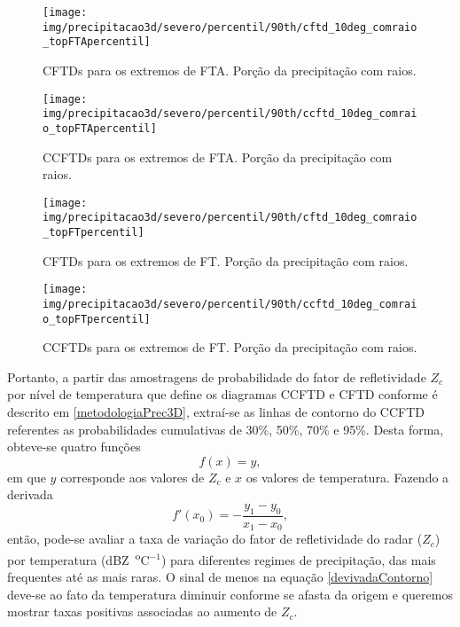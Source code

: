 \begin{sidewaysfigure}%
\centering
\texttt{[image: img/precipitacao3d/severo/percentil/90th/cftd\_10deg\_comraio\_topFTApercentil]}
\caption{CFTDs para os extremos de FTA. Porção da precipitação com raios.}
\label{cftd_fta_com}
\end{sidewaysfigure} 

\begin{sidewaysfigure}%
\centering
\texttt{[image: img/precipitacao3d/severo/percentil/90th/ccftd\_10deg\_comraio\_topFTApercentil]}
\caption{CCFTDs para os extremos de FTA. Porção da precipitação com raios.}
\label{ccftd_fta_com}
\end{sidewaysfigure} 

\begin{sidewaysfigure}%
\centering
\texttt{[image: img/precipitacao3d/severo/percentil/90th/cftd\_10deg\_comraio\_topFTpercentil]}
\caption{CFTDs para os extremos de FT. Porção da precipitação com raios.}
\label{cftd_ft_com}
\end{sidewaysfigure} 

\begin{sidewaysfigure}%
\centering
\texttt{[image: img/precipitacao3d/severo/percentil/90th/ccftd\_10deg\_comraio\_topFTpercentil]}
\caption{CCFTDs para os extremos de FT. Porção da precipitação com raios.}
\label{ccftd_ft_com}
\end{sidewaysfigure} 

Portanto, a partir das amostragens de probabilidade do fator de refletividade $Z_c$ por nível de temperatura que define os diagramas CCFTD e CFTD conforme é descrito em \ref{metodologiaPrec3D},  extraí-se as linhas de contorno do CCFTD referentes as probabilidades cumulativas de 30\%, 50\%, 70\% e 95\%. Desta forma, obteve-se quatro funções 
\begin{equation}
f(x)=y ,
\end{equation} 
em que $y$ corresponde aos valores de $Z_c$ e $x$ os valores de temperatura. Fazendo a derivada 
\begin{equation}
f'(x_0)= - \dfrac{y_1 - y_0}{x_1 - x_0},
\label{devivadaContorno}
\end{equation}
então, pode-se avaliar a taxa de variação do fator de refletividade do radar ($Z_c$) por temperatura (dBZ~\textsuperscript{o}C$^{-1}$) para diferentes regimes de precipitação, das mais frequentes até as mais raras. O sinal de menos na equação \ref{devivadaContorno} deve-se ao fato da temperatura diminuir conforme se afasta da origem e queremos mostrar taxas positivas associadas ao aumento de $Z_c$.

